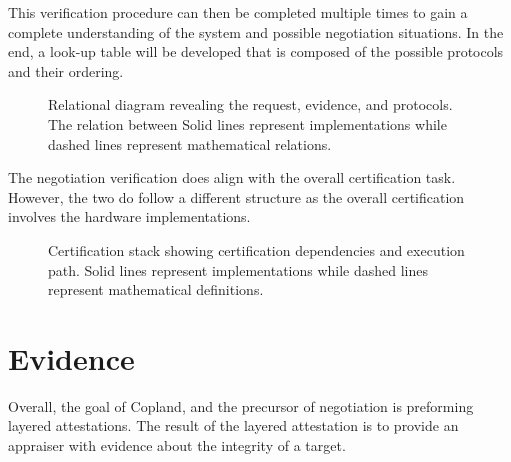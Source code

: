 \documentclass[10pt]{report}
\begin{document}
This verification procedure can then be completed multiple times to gain
a complete understanding of the system and possible negotiation situations.
In the end, a look-up table will be developed that is composed of the possible
protocols and their ordering. 

\begin{figure}[hbtp]
  \centering
  
  \caption[Relational Figure]{ Relational diagram revealing the request,
    evidence, and protocols. The relation between  Solid lines
    represent implementations while dashed lines represent
    mathematical relations.}
  \label{fig:certification-fig}
\end{figure}

The negotiation verification does align with the overall certification task.
However, the two do follow a different structure as the overall certification
involves the hardware implementations. 


\begin{figure}[hbtp]
  \centering
  
  \caption[Certification Figure]{Certification stack showing
    certification dependencies and execution path. Solid lines
    represent implementations while dashed lines represent
    mathematical definitions.}
  \label{fig:certification-fig}
\end{figure}

\section {Evidence}

Overall, the goal of Copland, and the precursor of negotiation is preforming
layered attestations.  The result of the layered attestation is to provide
an appraiser with evidence about the integrity of a target. 
\end{document}

